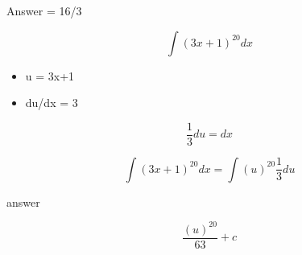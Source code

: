Answer = 16/3


\[ \int (3x+1)^{20} dx  \]

\begin{itemize}
\item u = 3x+1
\item du/dx = 3
\end{itemize}

\[ \frac{1}{3} du = dx \]



\[ \int (3x+1)^{20} dx  = \int (u)^{20} \frac{1}{3} du  \]

answer

\[ \frac{(u)^{20}}{63} + c \]

